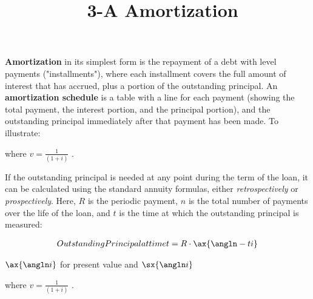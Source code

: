 \documentclass[12pt]{article}
\title{\normalfont\ 3-A Amortization} %
\author{} %
\date{}  %
\begin{document}

\maketitle %
\vspace{-1.1in}

\begin{flushleft}
    \textbf{Amortization} in its simplest form is the repayment of a debt with level payments ("installments"),
    where each installment covers the full amount of interest that has accrued, plus a portion of the outstanding
    principal.  An \textbf{amortization schedule} is a table with a line for each payment (showing the
    total payment, the interest portion, and the principal portion), and the outstanding principal immediately after
    that payment has been made.  To illustrate:
\end{flushleft}

\begin{flushleft}
    where {\large $ v = \frac{1}{(1+i)} $ }.
\end{flushleft}
\vspace{.1in}

\begin{flushleft}
    If the outstanding principal is needed at any point during the term of
    the loan, it can be calculated using the standard annuity formulas, either \textit{retrospectively} or
    \textit{prospectively}.  Here, $ R $ is the periodic payment, $ n $ is the total
    number of payments over the life of the loan, and $ t $ is the time at which the outstanding
    principal is measured:
\end{flushleft}

\begin{align*}
    Outstanding Principal at time t & = R \cdot \ax{\angln-t i} \\
\end{align*}
\vspace{-.2in}

{\Large $ \ax{ \angln i} $} for present value and {\Large $ \sx{ \angln i} $}

\begin{flushleft}
    where {\large $ v = \frac{1}{(1+i)} $ }.
\end{flushleft}
\vspace{.1in}
\end{document}
